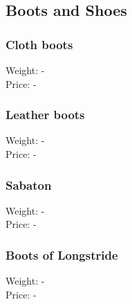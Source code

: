 \subsection{Boots and Shoes}

\subsubsection{Cloth boots}
Weight: -\\
Price: -\\

\subsubsection{Leather boots}
Weight: -\\
Price: -\\

\subsubsection{Sabaton}
Weight: -\\
Price: -\\

\subsubsection{Boots of Longstride}
Weight: -\\
Price: -\\
